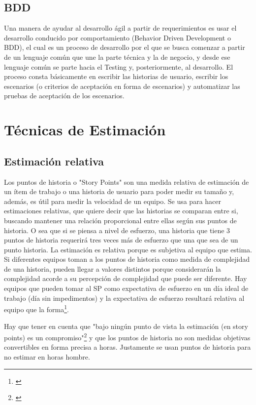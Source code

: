 \subsection{BDD}

Una manera de ayudar al desarrollo ágil a partir de requerimientos es usar el desarrollo conducido por comportamiento (Behavior Driven Development o BDD), el cual es un proceso de desarrollo por el que se busca comenzar a partir de un lenguaje común que une la parte técnica y la de negocio, y desde ese lenguaje común se parte hacia el Testing y, posteriormente, al desarrollo. El proceso consta básicamente en escribir las historias de usuario, escribir los escenarios (o criterios de aceptación en forma de escenarios) y automatizar las pruebas de aceptación de los escenarios.


\section{Técnicas de Estimación}

\subsection{Estimación relativa}

Los puntos de historia o "Story Points" son una medida relativa de estimación de un ítem de trabajo o una historia de usuario para poder medir su tamaño y, además, es útil para medir la velocidad de un equipo. Se usa para hacer estimaciones relativas, que quiere decir que las historias se comparan entre si, buscando mantener una relación proporcional entre ellas según sus puntos de historia. O sea que si se piensa a nivel de esfuerzo, una historia que tiene 3 puntos de historia requerirá tres veces más de esfuerzo que una que sea de un punto historia.
La estimación es relativa porque es subjetiva al equipo que estima. Si diferentes equipos toman a los puntos de historia como medida de complejidad de una historia, pueden llegar a valores distintos porque considerarán la complejidad acorde a su percepción de complejidad que puede ser diferente. Hay equipos que pueden tomar al SP como expectativa de esfuerzo en un día ideal de trabajo (día sin impedimentos) y la expectativa de esfuerzo resultará relativa al equipo que la forma\footnote{\cite{Cohn-2004}}.

Hay que tener en cuenta que "bajo ningún punto de vista la estimación (en story points) es un compromiso"\footnote{\cite{UNTREF-2014}} y que los puntos de historia no son medidas objetivas convertibles en forma precisa a horas. Justamente se usan puntos de historia para no estimar en horas hombre.

